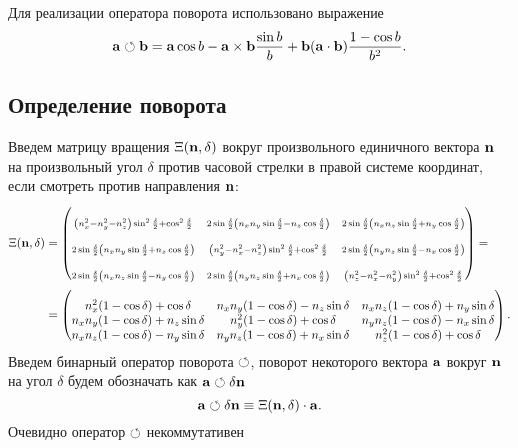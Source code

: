 Для реализации оператора поворота использовано выражение
$$
{\bf a}\circlearrowleft{\bf b} = {\bf a}\cos b - {\bf a}\times{\bf b} \frac{\sin b}{b} + {\bf b} ({\bf a}\cdot{\bf b})\frac{1-\cos b}{b^2}.
$$

\subsection{Определение поворота}
Введем матрицу вращения $\Xi({\bf n},\delta)$ вокруг произвольного
единичного вектора ${\bf n}$ на произвольный угол $\delta$
против часовой стрелки в правой системе координат, если смотреть против направления ${\bf n}$:
\begin{align}
\Xi(\n,\delta) &= 
\left( \begin{matrix}
\mstyle\rule{0pt}{18pt}
\mstyle
\left(n_x^2-n_y^2-n_z^2\right)\sin^2\frac\delta 2+\cos^2\frac\delta 2 &
\mstyle
2\sin\frac\delta 2\left(n_xn_y\sin\frac\delta 2-n_z\cos\frac\delta 2\right) &
\mstyle
2\sin\frac\delta 2\left(n_xn_z\sin\frac\delta 2+n_y\cos\frac\delta 2\right) \\
\mstyle\rule{0pt}{18pt}
2\sin\frac\delta 2\left(n_xn_y\sin\frac\delta 2+n_z\cos\frac\delta 2\right) &
\mstyle
\left(n_y^2-n_x^2-n_z^2\right)\sin^2\frac\delta 2+\cos^2\frac\delta 2 &
\mstyle
2\sin\frac\delta 2\left(n_yn_z\sin\frac\delta 2-n_x\cos\frac\delta 2\right) \\
\mstyle\rule{0pt}{18pt}
2\sin\frac\delta 2\left(n_xn_z\sin\frac\delta 2-n_y\cos\frac\delta 2\right) &
\mstyle
2\sin\frac\delta 2\left(n_yn_z\sin\frac\delta 2+n_x\cos\frac\delta 2\right) &
\mstyle
\left(n_z^2-n_x^2-n_y^2\right)\sin^2\frac\delta 2+\cos^2\frac\delta 2 
\end{matrix} \right) = \notag \\ &=
\left( \begin{matrix}
\rule{0pt}{18pt}
n_x^2(1-\cos\delta)+ \cos\delta         & n_x n_y (1-\cos\delta) - n_z \sin\delta  &  n_x n_z (1-\cos\delta) + n_y \sin\delta \\
n_x n_y (1-\cos\delta) + n_z \sin\delta &  n_y^2(1-\cos\delta)+ \cos\delta         &  n_y n_z (1-\cos\delta) - n_x \sin\delta \\
n_x n_z (1-\cos\delta) - n_y \sin\delta &  n_y n_z (1-\cos\delta) + n_x \sin\delta & n_z^2(1-\cos\delta)+ \cos\delta 
\end{matrix} \right).
\notag
\end{align}
Введем бинарный оператор поворота $\circlearrowleft$, поворот некоторого вектора ${\bf a}$ вокруг ${\bf n}$ на угол $\delta$ будем обозначать как ${\bf a} \circlearrowleft \delta{\bf n}$
$$
{\bf a} \circlearrowleft \delta{\bf n} \equiv \Xi({\bf n}, \delta) \cdot {\bf a}.
$$
Очевидно оператор $\circlearrowleft$ некоммутативен 
